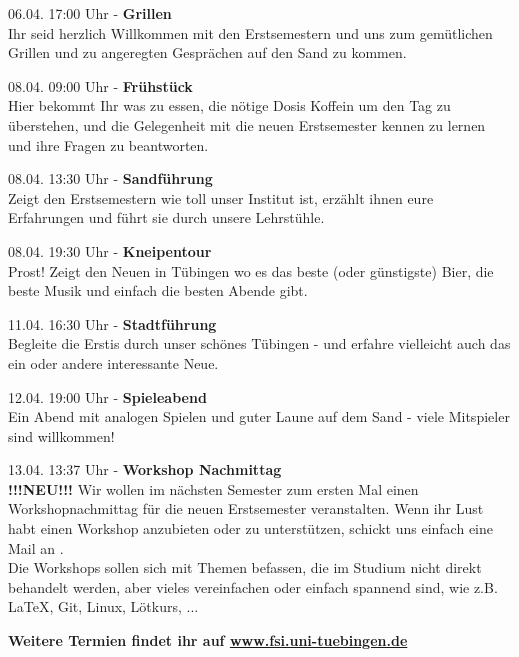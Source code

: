 \large 06.04. 17:00 Uhr - \textbf{Grillen}\\
\normalsize
Ihr seid herzlich Willkommen mit den Erstsemestern und uns zum gemütlichen Grillen und zu angeregten Gesprächen auf den Sand zu kommen.

\large 08.04. 09:00 Uhr - \textbf{Frühstück}\\
\normalsize
Hier bekommt Ihr was zu essen, die nötige Dosis Koffein um den Tag zu überstehen, und die Gelegenheit mit die neuen Erstsemester kennen zu lernen  und ihre Fragen zu beantworten.

\large 08.04. 13:30 Uhr - \textbf{Sandführung}\\
\normalsize
Zeigt den Erstsemestern wie toll unser Institut ist, erzählt ihnen eure Erfahrungen und führt sie durch unsere Lehrstühle.

\large 08.04. 19:30 Uhr - \textbf{Kneipentour}\\
\normalsize
Prost! Zeigt den Neuen in Tübingen wo es das beste (oder günstigste) Bier, die beste Musik und einfach die besten Abende gibt. 

\large 11.04. 16:30 Uhr - \textbf{Stadtführung}\\
\normalsize
Begleite die Erstis durch unser schönes Tübingen - und erfahre vielleicht auch das ein oder andere interessante Neue.

\large 12.04. 19:00 Uhr - \textbf{Spieleabend}\\
\normalsize
Ein Abend mit analogen Spielen und guter Laune auf dem Sand - viele Mitspieler sind willkommen!

\large 13.04. 13:37 Uhr - \textbf{Workshop Nachmittag}\\
\normalsize
\textbf{!!!NEU!!!} 	Wir wollen im nächsten Semester zum ersten Mal einen Workshopnachmittag für die neuen Erstsemester veranstalten. Wenn ihr Lust habt einen Workshop anzubieten oder zu unterstützen, schickt uns einfach eine Mail an .\\
Die Workshops sollen sich mit Themen befassen, die im Studium nicht direkt behandelt werden, aber vieles vereinfachen oder einfach spannend sind, wie z.B. \LaTeX, Git, Linux, Lötkurs, ... 

\vfill
\centering \large \textbf{Weitere Termien findet ihr auf \url{www.fsi.uni-tuebingen.de}}

